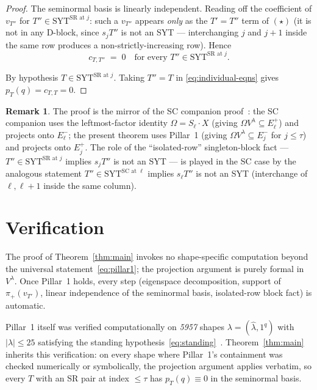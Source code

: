 \documentclass[11pt]{article}
\theoremstyle{definition}
\newtheorem{remark}[theorem]{Remark}
\newcommand{\Vlam}{V^\lambda}
\newcommand{\Om}{\Omega}
\newcommand{\hatl}{\widehat\lambda}
\newcommand{\SYT}{\mathrm{SYT}}
\newcommand{\Eplus}{E^+}
\newcommand{\Eminus}{E^-}
\newcommand{\pT}{p_T}
\begin{document}
\begin{proof}
The seminormal basis is linearly independent. Reading off the coefficient
of $v_{T''}$ for $T'' \in \SYT^{\mathrm{SR}\text{ at }j}$: such a $v_{T''}$
appears \emph{only} as the $T' = T''$ term of $(\star)$ (it is not in any
D-block, since $s_j T''$ is not an SYT — interchanging $j$ and $j+1$ inside
the same row produces a non-strictly-increasing row). Hence
\begin{equation}\label{eq:individual-eqns}
   c_{T, T''} \;=\; 0
   \quad \text{for every } T'' \in \SYT^{\mathrm{SR}\text{ at }j}.
\end{equation}

By hypothesis $T \in \SYT^{\mathrm{SR}\text{ at }j}$. Taking $T'' = T$ in
\eqref{eq:individual-eqns} gives $\pT(q) = c_{T, T} = 0$.
\end{proof}

\begin{remark}
The proof is the mirror of the SC companion proof~\cite{leftmostPerSYT}:
the SC companion uses the leftmost-factor identity $\Om = S_\ell \cdot X$
(giving $\Om \Vlam \subseteq \Eplus_\ell$) and projects onto $\Eminus_\ell$;
the present theorem uses Pillar~1 (giving $\Om \Vlam \subseteq \Eminus_j$
for $j \le \tau$) and projects onto $\Eplus_j$. The role of the
``isolated-row'' singleton-block fact —
$T'' \in \SYT^{\mathrm{SR}\text{ at }j}$ implies $s_j T''$ is not an SYT —
is played in the SC case by the analogous statement
$T'' \in \SYT^{\mathrm{SC}\text{ at }\ell}$ implies $s_\ell T''$ is not an
SYT (interchange of $\ell, \ell+1$ inside the same column).
\end{remark}

\section{Verification}\label{sec:verify}

The proof of Theorem~\ref{thm:main} invokes no shape-specific computation
beyond the universal statement~\eqref{eq:pillar1}; the projection argument
is purely formal in $\Vlam$. Once Pillar~1 holds, every step
(eigenspace decomposition, support of $\pi_+(v_{T'})$, linear independence
of the seminormal basis, isolated-row block fact) is automatic.

Pillar~1 itself was verified computationally on \emph{5957} shapes
$\lambda = (\hatl, 1^q)$ with $|\lambda| \le 25$ satisfying the standing
hypothesis~\eqref{eq:standing}~\cite[\S\,Computational verification]{survey,pillar1}.
Theorem~\ref{thm:main} inherits this verification: on every shape where
Pillar~1's containment was checked numerically or symbolically, the
projection argument applies verbatim, so every $T$ with an SR pair at index
$\le \tau$ has $\pT(q) \equiv 0$ in the seminormal basis.
\end{document}

